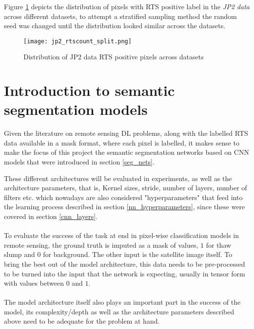 Figure \ref{jp2_rts_pixel_dist} depicts the distribution of pixels with \gls{RTS} positive label in the \textit{\gls{JP2} data} across different datasets, to attempt a stratified sampling method the random seed was changed until the distribution looked similar across the datasets.

    \begin{figure}[hbt!]
        \centering
        \texttt{[image: jp2\_rtscount\_split.png]}
        \caption{Distribution of \gls{JP2} data \gls{RTS} positive pixels across datasets}
        \label{jp2_rts_pixel_dist}
    \end{figure}

\section{Introduction to semantic segmentation models}
\paragraph{}
Given the literature on remote sensing \gls{DL} problems, along with the labelled \gls{RTS} data available in a mask format, where each pixel is labelled, it makes sense to make the focus of this project the semantic segmentation networks based on CNN models that were introduced in section \ref{seg_nets}.

These different architectures will be evaluated in experiments, as well as the architecture parameters, that is, Kernel sizes, stride, number of layers, number of filters etc. which nowadays are also considered "hyperparameters" that feed into the learning process described in section \ref{nn_hyperparameters}, since these were covered in section \ref{cnn_layers}.

\paragraph{}
To evaluate the success of the task at end in pixel-wise classification models in remote sensing, the ground truth is imputed as a mask of values, $1$ for thaw slump and $0$ for background. The other input is the satellite image itself. To bring the best out of the model architecture, this data needs to be pre-processed to be turned into the input that the network is expecting, usually in tensor form with values between $0$ and $1$.
\paragraph{}
The model architecture itself also plays an important part in the success of the model, its complexity/depth as well as the architecture parameters described above need to be adequate for the problem at hand.


